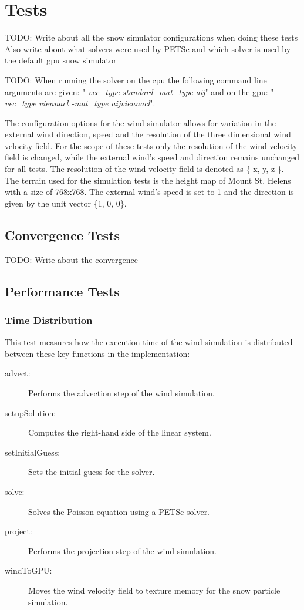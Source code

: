 \section{Tests}

TODO: Write about all the snow simulator configurations when doing these tests
Also write about what solvers were used by PETSc and which solver is used
by the default gpu snow simulator

TODO: When running the solver on the cpu the following command line arguments
are given: "\emph{-vec\_type standard -mat\_type aij}" and on the gpu:
"\emph{-vec\_type viennacl -mat\_type aijviennacl}".

The configuration options for the wind simulator allows for variation in the
external wind direction, speed and the resolution of the three dimensional wind
velocity field. For the scope of these tests only the resolution of the wind
velocity field is changed, while the external wind's speed and direction remains
unchanged for all tests. The resolution of the wind velocity field is denoted
as \{ x, y, z \}. The terrain used for the simulation tests is the height map of
Mount St. Helens with a size of 768x768. The external wind's speed is set to 1
and the direction is given by the unit vector \{1, 0, 0\}.

\subsection{Convergence Tests}

TODO: Write about the convergence

\subsection{Performance Tests}

\subsubsection{Time Distribution}

This test measures how the execution time of the wind simulation is distributed
between these key functions in the implementation:
\begin{description}
	\item[advect:] Performs the advection step of the wind simulation.
	\item[setupSolution:] Computes the right-hand side of the linear system.
	\item[setInitialGuess:] Sets the initial guess for the solver.
	\item[solve:] Solves the Poisson equation using a PETSc solver.
	\item[project:] Performs the projection step of the wind simulation.
	\item[windToGPU:] Moves the wind velocity field to texture memory for the
	snow particle simulation.
\end{description}

